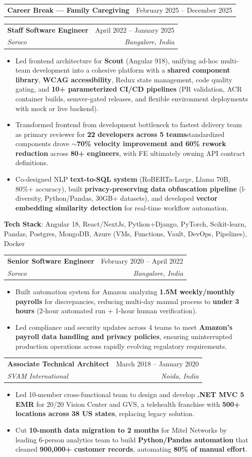 \documentclass[a4paper,11pt]{article}
\makeatletter
\newcommand{\resumeItem}[1]{
  \item\small{
    {#1 \vspace{-3pt}}
  }
}
\newcommand{\resumeSubheading}[4]{
  \vspace{-2pt}\item
    \begin{tabular*}{0.97\textwidth}[t]{l@{\extracolsep{\fill}}r}
      \textbf{#1} & #2 \\
      \textit{\small#3} & \textit{\small #4} \\
    \end{tabular*}\vspace{-7pt}
}
\newcommand{\resumeProjectHeading}[2]{
    \item
    \begin{tabular*}{0.97\textwidth}{l@{\extracolsep{\fill}}r}
      \small#1 & #2 \\
    \end{tabular*}\vspace{-7pt}
}
\newcommand{\resumeItemListStart}{\begin{itemize}}
\newcommand{\resumeItemListEnd}{\end{itemize}\vspace{-8pt}}
\makeatother
\begin{document}
\resumeProjectHeading{\textbf{Career Break --- Family Caregiving}}{February 2025 -- December 2025}

\vspace{4pt}
\resumeSubheading{Staff Software Engineer}{April 2022 -- January 2025}{Soroco}{Bangalore, India}
\resumeItemListStart
\resumeItem{Led frontend architecture for \textbf{Scout} (Angular 9\textrightarrow{}18), unifying ad-hoc multi-team development into a cohesive platform with a \textbf{shared component library}, \textbf{WCAG accessibility}, Redux state management, code quality gating, and \textbf{10+ parameterized CI/CD pipelines} (PR validation, ACR container builds, semver-gated releases, and flexible environment deployments with mock or live backend).}
\resumeItem{Transformed frontend from development bottleneck to fastest delivery team as primary reviewer for \textbf{22 developers across 5 teams}\textemdash{}standardized components drove \textbf{$\sim$70\% velocity improvement and 60\% rework reduction} across \textbf{80+ engineers}, with FE ultimately owning API contract definitions.}
\resumeItem{Co-designed NLP \textbf{text-to-SQL system} (RoBERTa-Large, Llama 70B, 80\%+ accuracy), built \textbf{privacy-preserving data obfuscation pipeline} (l-diversity, Python/Pandas, 30GB+ datasets), and developed \textbf{vector embedding similarity detection} for real-time workflow automation.}
\resumeItemListEnd
\vspace{2pt}
{\small\textbf{Tech Stack}: Angular 18, React/NextJs, Python+Django, PyTorch, Scikit-learn, Pandas, Postgres, MongoDB, Azure (VMs, Functions, Vault, DevOps, Pipelines), Docker}

\resumeSubheading{Senior Software Engineer}{February 2020 -- April 2022}{Soroco}{Bangalore, India}
\resumeItemListStart
\resumeItem{Built automation system for Amazon analyzing \textbf{1.5M weekly/monthly payrolls} for discrepancies, reducing multi-day manual process to \textbf{under 3 hours} (2-hour automated run + 1-hour human verification).}
\resumeItem{Led compliance and security updates across 4 teams to meet \textbf{Amazon's payroll data handling and privacy policies}, ensuring uninterrupted production operations across rapidly evolving regulatory requirements.}
\resumeItemListEnd

\resumeSubheading{Associate Technical Architect}{March 2018 -- January 2020}{SVAM International}{Noida, India}
\resumeItemListStart
\resumeItem{Led 10-member cross-functional team to design and develop \textbf{.NET MVC 5 EMR} for 20/20 Vision Center and GVS, a telehealth franchise with \textbf{500+ locations across 38 US states}, replacing legacy solution.}
\resumeItem{Cut \textbf{10-month data migration to 2 months} for Mitel Networks by leading 6-person analytics team to build \textbf{Python/Pandas automation} that cleaned \textbf{900,000+ customer records}, automating \textbf{80\% of manual effort}.}
\resumeItemListEnd
\end{document}
